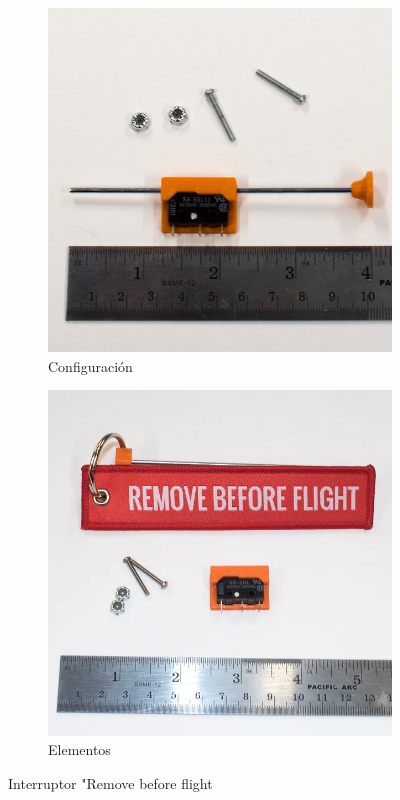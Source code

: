 \begin{figure}[h]
  \centering
  \begin{subfigure}{0.3\linewidth}
    \includegraphics[width=\linewidth]{Pictures/rbfinterruptor.jpg}
    \caption{Configuración}
    \label{fig:subfiguraA}
  \end{subfigure}
  \hspace{1cm} %
  \begin{subfigure}{0.3\linewidth}
    \includegraphics[width=\linewidth]{Pictures/rbfitems.png}
    \caption{Elementos}
    \label{fig:subfiguraB}
  \end{subfigure}
  \caption{Interruptor "Remove before flight \cite{labralab_pull_pin_switch_kit_2023}}
  \label{fig:figuraPrincipal}
\end{figure}

